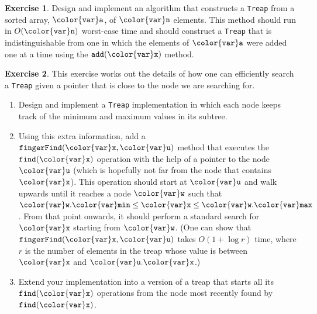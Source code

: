 \documentclass[10pt]{book}
\theoremstyle{plain}
\theoremstyle{definition}
\newtheorem{exc}{Exercise}[chapter]
\begin{document}
\begin{exc}
  Design and implement an algorithm that constructs a \texttt{Treap} from a
  sorted array, \ensuremath{\mathtt{{\color{var}a}}}, of \ensuremath{\mathtt{{\color{var}n}}} elements.  This method should run in $O(\ensuremath{\mathtt{{\color{var}n}}})$
  worst-case time and should construct a \texttt{Treap} that is indistinguishable
  from one in which the elements of \ensuremath{\mathtt{{\color{var}a}}} were added one at a time using
  the \ensuremath{\mathtt{add({\color{var}x})}} method.
\end{exc}


\begin{exc}
  This exercise works out the details of how one can efficiently search
  a \texttt{Treap} given a pointer that is close to the node we are searching for.
  \begin{enumerate}
    \item Design and implement a \texttt{Treap} implementation in which each
      node keeps track of the minimum and maximum values in its subtree.
    \item Using this extra information, add a \ensuremath{\mathtt{fingerFind({\color{var}x},{\color{var}u})}} method
      that executes the \ensuremath{\mathtt{find({\color{var}x})}} operation with the help of a pointer
      to the node \ensuremath{\mathtt{{\color{var}u}}} (which is hopefully not far from the node that
      contains \ensuremath{\mathtt{{\color{var}x}}}).  This operation should start at \ensuremath{\mathtt{{\color{var}u}}} and walk upwards
      until it reaches a node \ensuremath{\mathtt{{\color{var}w}}} such that $\ensuremath{\mathtt{{\color{var}w}.{\color{var}min}}}\le \ensuremath{\mathtt{{\color{var}x}}}\le \ensuremath{\mathtt{{\color{var}w}.{\color{var}max}}}$.
      From that point onwards, it should perform a standard search
      for \ensuremath{\mathtt{{\color{var}x}}} starting from \ensuremath{\mathtt{{\color{var}w}}}.  (One can show that \ensuremath{\mathtt{fingerFind({\color{var}x},{\color{var}u})}}
      takes $O(1+\log r)$ time, where $r$ is the number of elements in
      the treap whose value is between \ensuremath{\mathtt{{\color{var}x}}} and \ensuremath{\mathtt{{\color{var}u}.{\color{var}x}}}.)
    \item Extend your implementation into a version of a treap that
      starts all its \ensuremath{\mathtt{find({\color{var}x})}} operations from the node most recently
      found by \ensuremath{\mathtt{find({\color{var}x})}}.
  \end{enumerate}
\end{exc}
\end{document}
